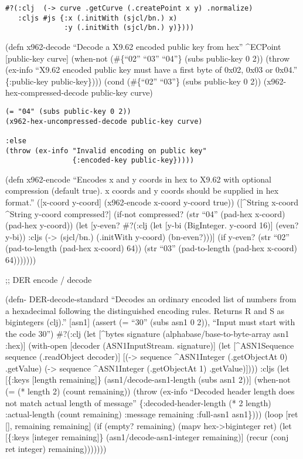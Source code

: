 \documentclass[
]{article}
\begin{document}
\begin{verbatim}
#?(:clj  (-> curve .getCurve (.createPoint x y) .normalize) 
   :cljs #js {:x (.initWith (sjcl/bn.) x) 
              :y (.initWith (sjcl/bn.) y)}))) 
\end{verbatim}

(defn x962-decode ``Decode a X9.62 encoded public key from hex''
\^{}ECPoint {[}public-key curve{]} (when-not (\#\{``02'' ``03'' ``04''\}
(subs public-key 0 2)) (throw (ex-info ``X9.62 encoded public key must
have a first byte of 0x02, 0x03 or 0x04.'' \{:public-key public-key\})))
(cond (\#\{``02'' ``03''\} (subs public-key 0 2))
(x962-hex-compressed-decode public-key curve)

\begin{verbatim}
(= "04" (subs public-key 0 2)) 
(x962-hex-uncompressed-decode public-key curve) 

:else 
(throw (ex-info "Invalid encoding on public key" 
                {:encoded-key public-key})))) 
\end{verbatim}

(defn x962-encode ``Encodes x and y coords in hex to X9.62 with optional
compression (default true). x coords and y coords should be supplied in
hex format.'' ({[}x-coord y-coord{]} (x962-encode x-coord y-coord true))
({[}\^{}String x-coord \^{}String y-coord compressed?{]} (if-not
compressed? (str ``04'' (pad-hex x-coord) (pad-hex y-coord)) (let
{[}y-even? \#?(:clj (let {[}y-bi (BigInteger. y-coord 16){]} (even?
y-bi)) :cljs (-\textgreater{} (sjcl/bn.) (.initWith y-coord)
(bn-even?))){]} (if y-even? (str ``02'' (pad-to-length (pad-hex x-coord)
64)) (str ``03'' (pad-to-length (pad-hex x-coord) 64)))))))

;; DER encode / decode

(defn- DER-decode-standard ``Decodes an ordinary encoded list of numbers
from a hexadecimal following the distinguished encoding rules. Returns R
and S as bigintegers (clj).'' {[}asn1{]} (assert (= ``30'' (subs asn1 0
2)), ``Input must start with the code 30'') \#?(:clj (let {[}\^{}bytes
signature (alphabase/base-to-byte-array asn1 :hex){]} (with-open
{[}decoder (ASN1InputStream. signature){]} (let {[}\^{}ASN1Sequence
sequence (.readObject decoder){]} {[}(-\textgreater{} sequence
\^{}ASN1Integer (.getObjectAt 0) .getValue) (-\textgreater{} sequence
\^{}ASN1Integer (.getObjectAt 1) .getValue){]}))) :cljs (let {[}\{:keys
{[}length remaining{]}\} (asn1/decode-asn1-length (subs asn1 2)){]}
(when-not (= (* length 2) (count remaining)) (throw (ex-info ``Decoded
header length does not match actual length of message''
\{:decoded-header-length (* 2 length) :actual-length (count remaining)
:message remaining :full-asn1 asn1\}))) (loop {[}ret {[}{]}, remaining
remaining{]} (if (empty? remaining) (mapv hex-\textgreater biginteger
ret) (let {[}\{:keys {[}integer remaining{]}\} (asn1/decode-asn1-integer
remaining){]} (recur (conj ret integer) remaining)))))))
\end{document}
